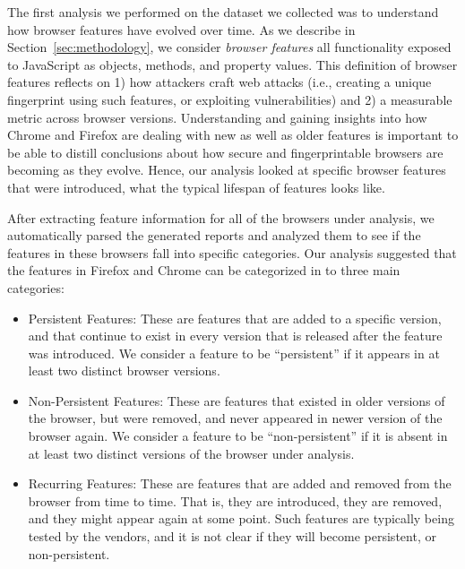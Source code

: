 The first analysis we performed on the dataset we collected was to
understand how browser features have evolved over time. As we describe in Section~\ref{sec:methodology}, we consider \textit{browser features} all functionality exposed to JavaScript as objects, methods, and property values. This definition of browser features reflects on 1) how attackers craft web attacks (i.e., creating a unique fingerprint using such features, or exploiting  vulnerabilities) and 2) a measurable metric across browser versions. Understanding
and gaining insights into how Chrome and Firefox are dealing with new
as well as older features is important to be able to distill
conclusions about how secure and fingerprintable browsers are becoming
as they evolve. Hence, our analysis looked at specific browser
features that were introduced, what the typical lifespan of features
looks like.

After extracting feature information for all of the browsers under
analysis, we automatically parsed the generated reports and analyzed
them to see if the features in these browsers fall into specific
categories. Our analysis suggested that the features in Firefox and
Chrome can be categorized in to three main categories:

\begin{itemize}
  
\item Persistent Features: These are features that are added to a
  specific version, and that continue to exist in every version that
  is released after the feature was introduced. We consider a feature
  to be ``persistent'' if it appears in at least two distinct browser
  versions.
      
\item Non-Persistent Features: These are features that existed in
  older versions of the browser, but were removed, and never appeared
  in newer version of the browser again. We consider a feature to be
  ``non-persistent'' if it is absent in at least two distinct versions
  of the browser under analysis.
      
\item Recurring Features: These are features that are added and
  removed from the browser from time to time. That is, they are
  introduced, they are removed, and they might appear again at some
  point. Such features are typically being tested by the vendors, and
  it is not clear if they will become persistent, or non-persistent.

\end{itemize}

